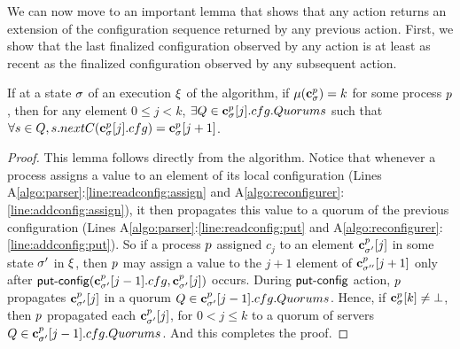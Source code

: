 We can now move to an important lemma that shows that any  action 
returns an extension of the configuration sequence returned by any previous  action. 
First, we show that the last finalized configuration observed by any  action is at least as 
recent as the finalized configuration observed by any subsequent  action. 

\begin{lemma}
	\label{lem:config:propagation}
	If at a state $\sigma$ of an execution $\EX$ of the algorithm, if $\mu(\mathbf{c}^{p}_{\sigma}) = k$ %
	for some process $p$, then for any element $0\leq j < k$, $\exists Q\in \mathbf{c}^{p}_{\sigma}[j].cfg.Quorums$
	such that $\forall s\in Q, s.nextC(\mathbf{c}^{p}_{\sigma}[j].cfg)= \mathbf{c}^{p}_{\sigma}[j+1]$. 
\end{lemma}
\begin{proof}
	This lemma follows directly from the algorithm. Notice that whenever a process assigns a value to 
	an element of its local configuration (Lines  A\ref{algo:parser}:\ref{line:readconfig:assign} and 
	A\ref{algo:reconfigurer}:\ref{line:addconfig:assign}), it then propagates this value to a quorum of the 
	previous configuration (Lines  A\ref{algo:parser}:\ref{line:readconfig:put} and 
	A\ref{algo:reconfigurer}:\ref{line:addconfig:put}). So if a process $p$ assigned $c_j$ to an 
	element $\mathbf{c}^{p}_{\sigma'}[j]$ in some state $\sigma'$ in $\EX$, then $p$ may assign a value 
	to the $j+1$ element of $\mathbf{c}^{p}_{\sigma''}[j+1]$ only after $\act{put-config}(\config{\cvec{\pr}{\st'}[j-1]},\cvec{\pr}{\st'}[j])$
	occurs. During $\act{put-config}$ action, $p$ propagates $\mathbf{c}^{p}_{\sigma'}[j]$ in a quorum 
	$Q\in\mathbf{c}^{p}_{\sigma'}[j-1].cfg.Quorums$. Hence, if $\mathbf{c}^{p}_{\sigma}[k]\neq\bot$, then $p$ 
	propagated each $\mathbf{c}^{p}_{\sigma'}[j]$, for $0<j\leq k$ to a quorum of servers $Q\in\mathbf{c}^{p}_{\sigma'}[j-1].cfg.Quorums$.
	And this completes the proof. 
%	
\end{proof}


